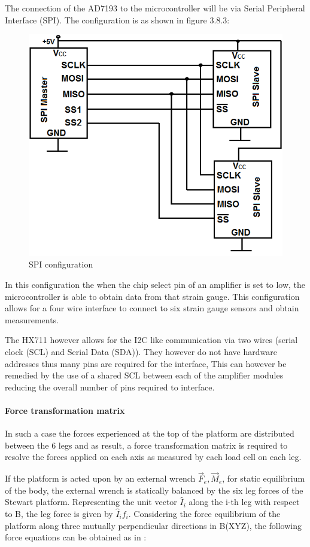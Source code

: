 The connection of the AD7193 to the microcontroller will be via Serial Peripheral Interface (SPI). The configuration is as shown in figure 3.8.3:
\begin{center}
\begin{figure}[H]
\centering
\includegraphics[width=0.55\linewidth]{Figures/SPI}
\caption[SPI configuration]{SPI configuration}
\end{figure}
\end{center}
In this configuration the when the chip select pin of an amplifier is set to low, the microcontroller is able to obtain data from that strain gauge. This configuration allows for a four wire interface to connect to six strain gauge sensors and obtain measurements.

The HX711 however allows for the I2C like communication via two wires (serial clock (SCL) and Serial Data (SDA)). They however do not have hardware addresses thus many pins are required for the interface, This can however be remedied by the use of a shared SCL between each of the amplifier modules reducing the overall number of pins required to interface.

\paragraph{Force transformation matrix} 
In such a case the forces experienced at the top of the platform are distributed between the 6 legs and as result, a force transformation matrix is required to resolve the forces applied on each axis as measured by each load cell on each leg. 

If the platform is acted upon by an external wrench {$\vec{F}_e, \vec{M}_e$}, for static equilibrium of the body, the external wrench is statically balanced by the six leg forces of the Stewart platform. Representing the unit vector $\hat{I}_i$ along the i-th leg with respect to B, the leg force is given  by $\hat{I}_if_i$. Considering the force equilibrium of the platform along  three mutually perpendicular directions in B(XYZ), the following force equations can be obtained as in \cite{dwarakanath_design_2001}:


